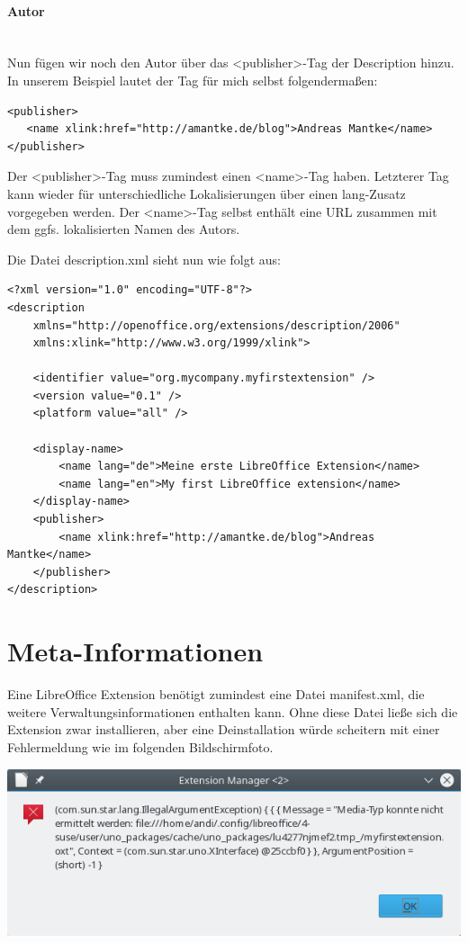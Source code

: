 \documentclass[a4paper,10pt,pagesize,titlepage]{scrbook}
\begin{document}
\paragraph*{Autor}$~~$\\

Nun fügen wir noch den Autor über das <publisher>-Tag der Description hinzu. In unserem Beispiel lautet der Tag für mich selbst folgendermaßen:
\begin{lstlisting}
<publisher>
   <name xlink:href="http://amantke.de/blog">Andreas Mantke</name>
</publisher>
\end{lstlisting}
Der <publisher>-Tag muss zumindest einen <name>-Tag haben. Letzterer Tag kann wieder für unterschiedliche Lokalisierungen über einen lang-Zusatz vorgegeben werden. Der <name>-Tag selbst enthält eine URL zusammen mit dem ggfs. lokalisierten Namen des Autors.

Die Datei description.xml sieht nun wie folgt aus:
\begin{lstlisting}
<?xml version="1.0" encoding="UTF-8"?>
<description
    xmlns="http://openoffice.org/extensions/description/2006"
    xmlns:xlink="http://www.w3.org/1999/xlink">

    <identifier value="org.mycompany.myfirstextension" />
    <version value="0.1" />
    <platform value="all" />

    <display-name>
        <name lang="de">Meine erste LibreOffice Extension</name>
        <name lang="en">My first LibreOffice extension</name>
    </display-name>
    <publisher>
        <name xlink:href="http://amantke.de/blog">Andreas Mantke</name>
    </publisher>    
</description>
\end{lstlisting}

\section{Meta-Informationen}

Eine LibreOffice Extension benötigt zumindest eine Datei manifest.xml, die weitere Verwaltungsinformationen enthalten kann. Ohne diese Datei ließe sich die Extension zwar installieren, aber eine Deinstallation würde scheitern mit einer Fehlermeldung wie im folgenden Bildschirmfoto.
\begin{center}
\includegraphics[width=0.7\linewidth]{pics/error_deinstallation_missing_manifest}
\label{fig:error_deinstallation_missing_manifest}
\end{center}
\end{document}

